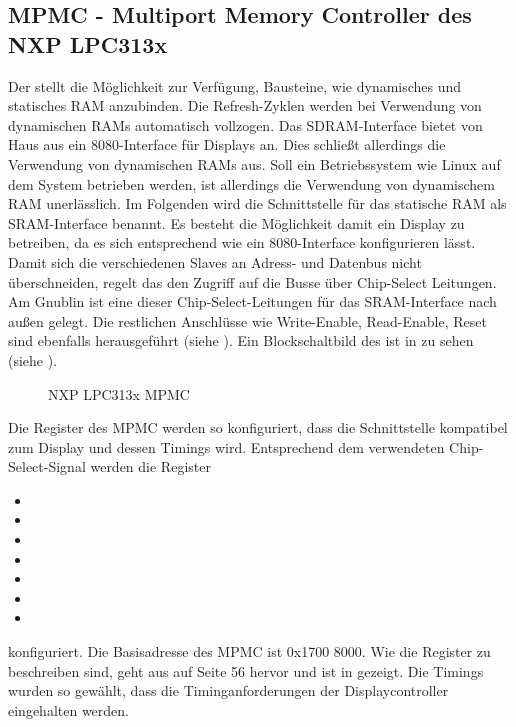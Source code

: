 \subsection{MPMC - Multiport Memory Controller des NXP LPC313x}
\label{cha:mpmc}

Der  stellt die Möglichkeit zur Verfügung, Bausteine, wie dynamisches und statisches RAM anzubinden. Die Refresh-Zyklen werden bei Verwendung von dynamischen RAMs automatisch vollzogen. Das SDRAM-Interface bietet von Haus aus ein 8080-Interface für Displays an. Dies schließt allerdings die Verwendung von dynamischen RAMs aus. Soll ein Betriebssystem wie Linux auf dem System betrieben werden, ist allerdings die Verwendung von dynamischem RAM unerlässlich. Im Folgenden wird die Schnittstelle für das statische RAM als SRAM-Interface benannt. Es besteht die Möglichkeit damit ein Display zu betreiben, da es sich entsprechend wie ein 8080-Interface konfigurieren lässt. Damit sich die verschiedenen Slaves an Adress- und Datenbus nicht überschneiden, regelt das  den Zugriff auf die Busse über Chip-Select Leitungen. Am Gnublin ist eine dieser Chip-Select-Leitungen für das SRAM-Interface nach außen gelegt. Die restlichen Anschlüsse wie Write-Enable, Read-Enable, Reset sind ebenfalls herausgeführt (siehe \cite{NXP2010}). Ein Blockschaltbild des  ist in  zu sehen (siehe \cite{NXP2010}).


\begin{figure}[tbph]
	\centering
{}
	\caption{NXP LPC313x MPMC}
	\label{fig:lpc_mpmc}
\end{figure}
\newpage
Die Register des MPMC werden so konfiguriert, dass die Schnittstelle kompatibel zum Display und dessen Timings wird. Entsprechend dem verwendeten Chip-Select-Signal werden die Register \begin{itemize}
\item {}
\item {}
\item  {}
\item  {}
\item  {}
\item  {}
\item {}
\end{itemize} konfiguriert. Die Basisadresse des MPMC ist 0x1700 8000. Wie die Register zu beschreiben sind, geht aus \cite{NXP2010} auf Seite 56 hervor und ist in  gezeigt. Die Timings wurden so gewählt, dass die Timinganforderungen der Displaycontroller eingehalten werden.

